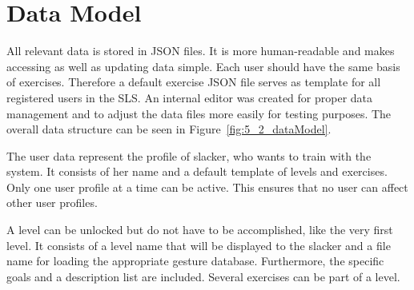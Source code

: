 \section{Data Model}\label{5_2_dataModel}
All relevant data is stored in JSON files. It is more human-readable and makes accessing as well as updating data simple. Each user should have the same basis of exercises. Therefore a default exercise JSON file serves as template for all registered users in the SLS. An internal editor was created for proper data management and to adjust the data files more easily for testing purposes. The overall data structure can be seen in Figure~\ref{fig:5_2_dataModel}.







The user data represent the profile of slacker, who wants to train with the system. It consists of her name and a default template of levels and exercises. Only one user profile at a time can be active. This ensures that no user can affect other user profiles.

A level can be unlocked but do not have to be accomplished, like the very first level. It consists of a level name that will be displayed to the slacker and a file name for loading the appropriate gesture database. Furthermore, the specific goals and a description list are included. Several exercises can be part of a level.

